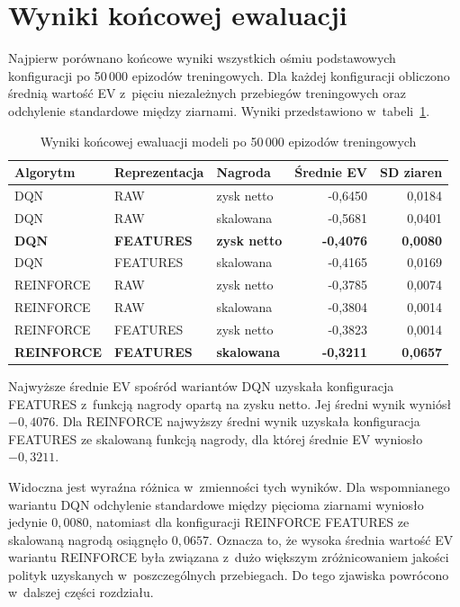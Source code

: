 \section{Wyniki końcowej ewaluacji}
\label{sec:wyniki-koncowej-ewaluacji}

Najpierw porównano końcowe wyniki wszystkich ośmiu
podstawowych konfiguracji po 50\,000 epizodów treningowych.
Dla każdej konfiguracji obliczono średnią wartość EV z~pięciu
niezależnych przebiegów treningowych oraz odchylenie standardowe między
ziarnami. Wyniki przedstawiono w~tabeli~\ref{tab:final-ev-50k}.

\begin{table}[htbp]
    \centering
    \caption{Wyniki końcowej ewaluacji modeli po 50\,000 epizodów treningowych}
    \label{tab:final-ev-50k}
    \begin{tabular}{lllrr}
        \toprule
        Algorytm & Reprezentacja & Nagroda & Średnie EV & SD ziaren \\
        \midrule
        DQN & RAW & zysk netto
            & -0{,}6450 & 0{,}0184 \\
        DQN & RAW & skalowana
            & -0{,}5681 & 0{,}0401 \\
        \textbf{DQN} & \textbf{FEATURES} & \textbf{zysk netto}
            & \textbf{-0{,}4076} & \textbf{0{,}0080} \\
        DQN & FEATURES & skalowana
            & -0{,}4165 & 0{,}0169 \\
        \midrule
        REINFORCE & RAW & zysk netto
            & -0{,}3785 & 0{,}0074 \\
        REINFORCE & RAW & skalowana
            & -0{,}3804 & 0{,}0014 \\
        REINFORCE & FEATURES & zysk netto
            & -0{,}3823 & 0{,}0014 \\
        \textbf{REINFORCE} & \textbf{FEATURES} & \textbf{skalowana}
            & \textbf{-0{,}3211} & \textbf{0{,}0657} \\
        \bottomrule
    \end{tabular}
\end{table}

Najwyższe średnie EV spośród wariantów DQN uzyskała konfiguracja
FEATURES z~funkcją nagrody opartą na zysku netto. Jej średni wynik
wyniósł $-0{,}4076$. Dla REINFORCE najwyższy średni wynik uzyskała
konfiguracja FEATURES ze skalowaną funkcją nagrody, dla której średnie
EV wyniosło $-0{,}3211$.

Widoczna jest wyraźna różnica w~zmienności tych wyników.
Dla wspomnianego wariantu DQN odchylenie standardowe między pięcioma
ziarnami wyniosło jedynie $0{,}0080$, natomiast dla konfiguracji
REINFORCE FEATURES ze skalowaną nagrodą osiągnęło $0{,}0657$.
Oznacza to, że wysoka średnia wartość EV wariantu REINFORCE była
związana z~dużo większym zróżnicowaniem jakości polityk uzyskanych
w~poszczególnych przebiegach. Do tego zjawiska powrócono w~dalszej części rozdziału.

